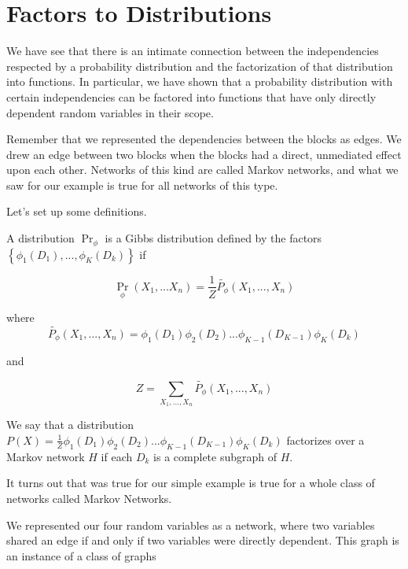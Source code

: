 \documentclass{article}
\begin{document}
\section{Factors to Distributions}
We have see that there is an intimate connection between the
independencies respected by a probability distribution and the
factorization of that distribution into functions. In particular, we
have shown that a probability distribution with certain independencies
can be factored into functions that have only directly dependent
random variables in their scope.

Remember that we represented the dependencies between the blocks as
edges. We drew an edge between two blocks when the blocks had a
direct, unmediated effect upon each other. Networks of this kind are
called Markov networks, and what we saw for our example is true for
all networks of this type.

Let's set up some definitions.

A distribution $\Pr_{\phi}$ is a Gibbs distribution defined by the factors
$\left\{\phi_1(D_1),...,\phi_K(D_k)\right\}$ if

\begin{equation}
\Pr_{\phi}(X_1,...X_n) = \frac{1}{Z}\tilde{P_{\phi}}(X_1,...,X_n)
\end{equation}

where
\begin{equation}
\tilde{P_{\phi}}(X_1,...,X_n) = \phi_1(D_1)\phi_2(D_2)...\phi_{K-1}(D_{K-1})\phi_K(D_k)
\end{equation}

and

\begin{equation}
Z = \sum_{X_1,...,X_n}\tilde{P_{\phi}}(X_1,...,X_n)
\end{equation}

We say that a distribution
$P(X)=\frac{1}{Z}\phi_1(D_1)\phi_2(D_2)...\phi_{K-1}(D_{K-1})\phi_K(D_k)$
factorizes over a Markov network $H$ if each $D_k$ is a complete
subgraph of $H$. 






It turns out that was true for our simple example is true for a whole
class of networks called Markov Networks.




We represented our four random variables as a network, where two variables
shared an edge if and only if two variables were directly dependent. This graph is an instance of a class of graphs 
\end{document}
